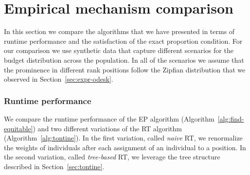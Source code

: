 \section{Empirical mechanism comparison}
\label{sec:expr-comparison}
In this section we compare the algorithms that we have presented in
terms of runtime performance and the satisfaction of the exact
proportion condition. For our comparison we use synthetic data that
capture different scenarios for the budget distribution across the
population. In all of the scenarios we assume that the prominence in
different rank positions follow the Zipfian distribution that we
observed in Section~\ref{sec:expr-odesk}.

\subsubsection{Runtime performance}
\label{sec:expr-runtime}

We compare the runtime performance of the EP algorithm
(Algorithm~\ref{alg:find-equitable}) and two different variations of
the RT algorithm (Algorithm~\ref{alg:tontine}). In the first
variation, called \emph{naive} RT, we renormalize the weights of
individuals after each assignment of an individual to a position. In
the second variation, called \emph{tree-based} RT, we leverage the
tree structure described in Section~\ref{sec:tontine}.

